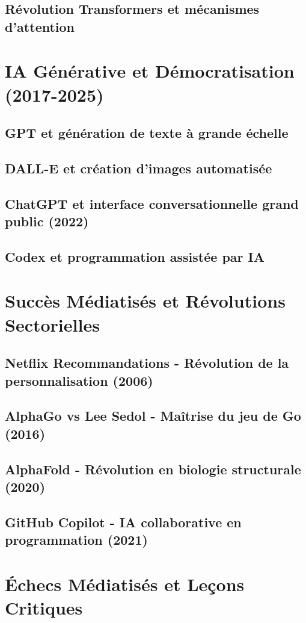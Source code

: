 \documentclass[12pt,a4paper]{book}
\begin{document}
\section{Révolution Transformers et mécanismes d'attention}

\chapter{IA Générative et Démocratisation (2017-2025)}
\section{GPT et génération de texte à grande échelle}
\section{DALL-E et création d'images automatisée}
\section{ChatGPT et interface conversationnelle grand public (2022)}
\section{Codex et programmation assistée par IA}

\chapter{Succès Médiatisés et Révolutions Sectorielles}
\section{Netflix Recommandations - Révolution de la personnalisation (2006)}
\section{AlphaGo vs Lee Sedol - Maîtrise du jeu de Go (2016)}
\section{AlphaFold - Révolution en biologie structurale (2020)}
\section{GitHub Copilot - IA collaborative en programmation (2021)}

\chapter{Échecs Médiatisés et Leçons Critiques}
\end{document}
